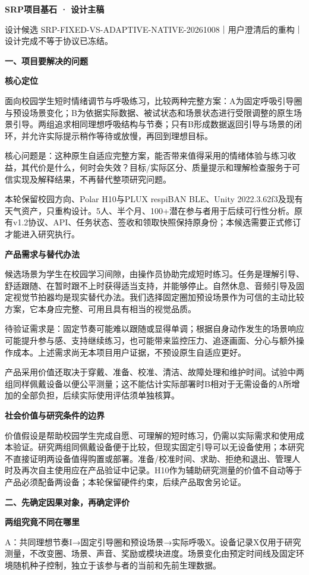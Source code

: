 \documentclass[11pt,a4paper]{article}
\newcommand{\reviewtitle}[1]{\begin{center}{\titlelatin\titlecjk\bfseries\fontsize{21}{28}\selectfont #1}\end{center}\vspace{8pt}}
\newcommand{\reviewsection}[1]{\par\Needspace{9\baselineskip}\vspace{10pt}\begin{center}{\titlelatin\titlecjk\bfseries\fontsize{14}{20}\selectfont #1}\end{center}}
\newcommand{\reviewsubsection}[1]{\par\Needspace{4\baselineskip}\vspace{4pt}\begin{center}{\titlelatin\titlecjk\bfseries\fontsize{12}{18}\selectfont #1}\end{center}}
\begin{document}
\reviewtitle{SRP项目基石 · 设计主稿}
设计候选 SRP-\allowbreak{}FIXED-\allowbreak{}VS-\allowbreak{}ADAPTIVE-\allowbreak{}NATIVE-\allowbreak{}20261008｜用户澄清后的重构｜设计完成不等于协议已冻结。


\reviewsection{一、项目要解决的问题}
\reviewsubsection{1.1 核心定位}
面向校园学生短时情绪调节与呼吸练习，比较两种完整方案：A为固定呼吸引导圈与预设场景变化；B为依据实际数据、被试状态和场景状态进行受限调整的原生场景引导。两组追求相同理想呼吸结构与节奏；只有B形成数据返回引导与场景的闭环，并允许实际提示稍作等待或放慢，再回到理想目标。


核心问题是：这种原生自适应完整方案，能否带来值得采用的情绪体验与练习收益，其代价是什么，何时会失效？目标/\allowbreak{}实际区分、质量提示和理解检查服务于可信实现及解释结果，不再替代整项研究问题。


本轮保留校园方向、Polar H10与PLUX respiBAN BLE、Unity 2022.3.62f3及现有天气资产，只重构设计。5人、半个月、100+潜在参与者用于后续可行性分析。原有v1.2协议、API、任务状态、签收和领取快照保持原身份；本候选需要正式修订才能进入研究执行。


\reviewsubsection{1.2 产品需求与替代办法}
候选场景为学生在校园学习间隙，由操作员协助完成短时练习。任务是理解引导、舒适跟随、在暂时跟不上时获得适当支持，并能够停止。自然休息、音频引导及固定视觉节拍器均是现实替代办法。我们选择固定圈加预设场景作为可信的主动比较方案，它本身应完整、可用且具有相当的视觉品质。


待验证需求是：固定节奏可能难以跟随或显得单调；根据自身动作发生的场景响应可能提升参与感、支持继续练习，也可能带来监控压力、追逐画面、分心与额外操作成本。上述需求尚无本项目用户证据，不预设原生自适应更好。


产品采用价值还取决于穿戴、准备、校准、清洁、故障处理和维护时间。试验中两组同样佩戴设备以便公平测量；这不能估计实际部署时B相对于无需设备的A所增加的全部负担，后续实际使用评估须单独核算。


\reviewsubsection{1.3 社会价值与研究条件的边界}
价值假设是帮助校园学生完成自愿、可理解的短时练习，仍需以实际需求和使用成本验证。研究两组同佩戴设备便于比较，但现实固定引导可以无设备使用；本研究不直接证明两设备值得购置或部署。准备/\allowbreak{}校准时间、求助、拒绝和退出、管理人时及再次自主使用应在产品验证中记录。H10作为辅助研究测量的价值不自动等于产品必须配备两设备；本轮保留硬件约束，后续产品取舍另论证。

\reviewsection{二、先确定因果对象，再确定评价}
\reviewsubsection{2.1 两组究竟不同在哪里}
A：共同理想节奏I→固定引导圈和预设场景→实际呼吸X。设备记录X仅用于研究测量，不改变圈、场景、声音、奖励或模块进度。场景变化由预定时间线及固定环境随机种子控制，独立于该参与者的当前和先前生理数据。
\end{document}
